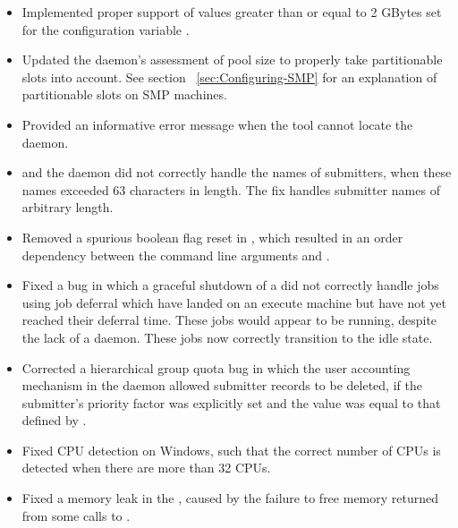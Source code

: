 \begin{itemize}

\item Implemented proper support of values greater than or equal to  2 GBytes
set for the configuration variable .

\item Updated the  daemon's assessment of pool size 
to properly take partitionable slots into account.
See section ~\ref{sec:Configuring-SMP} for an explanation of 
partitionable slots on SMP machines.

\item Provided an informative error message 
when the  tool cannot locate the  daemon.

\item {} and the  daemon 
did not correctly handle the names of submitters, 
when these names exceeded 63 characters in length.
The fix handles submitter names of arbitrary length.

\item Removed a spurious boolean flag reset in ,
which resulted in an order dependency between the command line arguments
 and .

\item Fixed a bug in which a graceful shutdown of a 
did not correctly handle jobs using job deferral
which have landed on an execute machine but have not yet
reached their deferral time.
These jobs would appear to be running, despite the lack of
a  daemon. 
These jobs now correctly transition to the idle state.

\item Corrected a hierarchical group quota bug in which
the user accounting mechanism in the  daemon allowed 
submitter records to be deleted,
if the submitter's priority factor was explicitly set and
the value was equal to that defined by .

\item Fixed CPU detection on Windows, such that the correct number of CPUs
is detected when there are more than 32 CPUs.

\item Fixed a memory leak in the ,
caused by the failure to
free memory returned from some calls to .


\end{itemize}
